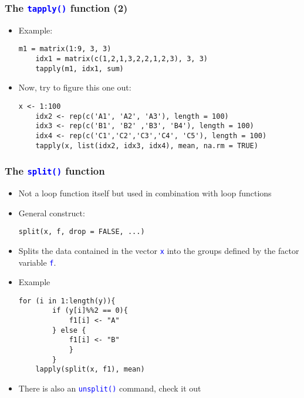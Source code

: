 \documentclass[10pt]{beamer}
\newcommand{\cc}[1]{\texttt{\textcolor{blue}{#1}}}
\theoremstyle{definition}
\begin{document}
\begin{frame}[fragile]
\frametitle{The \cc{tapply()} function (2)}
\begin{itemize}
	\item Example:
	\begin{lstlisting}[style = rstyle, breaklines]
	m1 = matrix(1:9, 3, 3)
	idx1 = matrix(c(1,2,1,3,2,2,1,2,3), 3, 3)
	tapply(m1, idx1, sum)
	\end{lstlisting}
	\item Now, try to figure this one out:
	\begin{lstlisting}[style = rstyle, breaklines]
	x <- 1:100
	idx2 <- rep(c('A1', 'A2', 'A3'), length = 100)
	idx3 <- rep(c('B1', 'B2' ,'B3', 'B4'), length = 100)
	idx4 <- rep(c('C1','C2','C3','C4', 'C5'), length = 100)
	tapply(x, list(idx2, idx3, idx4), mean, na.rm = TRUE)
	\end{lstlisting}
\end{itemize}
\end{frame}

\begin{frame}[fragile]
\frametitle{The \cc{split()} function}
\begin{itemize}
	\item Not a loop function itself but used in combination with loop functions
	\item General construct:
	\begin{lstlisting}[style = rstyle, breaklines]
	split(x, f, drop = FALSE, ...)
	\end{lstlisting}
	\item Splits the data contained in the vector \cc{x} into the groups defined by the factor variable \cc{f}.
	\item Example
	\begin{lstlisting}[style = rstyle, breaklines]
	for (i in 1:length(y)){
		if (y[i]%%2 == 0){
			f1[i] <- "A"
		} else {
			f1[i] <- "B"
			}
		}
	lapply(split(x, f1), mean)
	\end{lstlisting}
	\item There is also an \cc{unsplit()} command, check it out
\end{itemize}
\end{frame}
\end{document}
